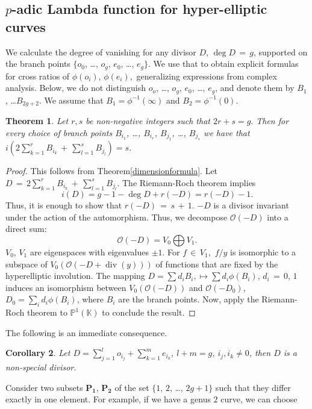 \documentclass[]{amsart}
\numberwithin{equation}{section}
\newtheorem{theorem}{Theorem}[section]
\newtheorem{corollary}[theorem]{Corollary}
\DeclareMathOperator{\divOp}{div}
\begin{document}
\subsection{$p$-adic Lambda function for  hyper-elliptic curves} 
We calculate the degree of vanishing for any divisor $D$, $\deg D \,{=}\,g$, supported on the branch points $\{o_0$, \ldots, $o_g$, $e_0$, \ldots, $e_{g}\}$. We use that to obtain explicit formulas  for cross ratios of  $\phi(o_i)$, $\phi(e_i),$ generalizing expressions
from complex analysis. Below, we do not distinguish $o_o$, \ldots, $o_g$, $e_0$, \ldots, $e_g$, and denote them by $B_1$, \ldots $B_{2g+2}$. We assume that $B_1=\phi^{-1}(\infty)$ and $B_2=\phi^{-1}(0).$
\begin{theorem} \label{mmm}
Let $r,s$ be non-negative integers such that $2r+s=g.$ Then for every choice of branch points $B_{i_1}$, \ldots, $B_{i_r}$, $B_{j_1}$, \ldots, $B_{j_s}$ we have that $i(2\sum_{k=1}^r B_{i_k}\,{+}\,\sum_{l=1}^s B_{j_l})=s$.
\end{theorem} 
\begin{proof}
This follows  from Theorem\;\ref{dimensionformula}.
Let $D\,{=}\,2\sum_{k=1}^r B_{i_k} \,{+}\,\sum_{l=1}^s B_{j_l}$. The Riemann-Roch theorem implies 
\begin{equation}
i(D)=g-1- \deg D + r({-}D) = r({-}D)-1.
\end{equation}
Thus, it is  enough to show that $r({-}D)\,{=}\,s\,{+}\,1$. ${-}D$ is a divisor invariant under the action of the automorphism. Thus, we decompose  $\mathcal{O}({-}D)$ into a direct sum: $$\mathcal{O}(-D)=V_0\bigoplus V_1.$$  $V_0$, $V_1$ are eigenspaces with eigenvalues $\pm{1}.$  For  $f\,{\in}\, V_1,$ $f/y$ is isomorphic  to a subspace of  
$V_0(\mathcal{O}(-D+\divOp (y)))$ of functions that are fixed by the hyperelliptic involution. The mapping  
$D=\sum d_i B_i,\mapsto \sum d_i\phi(B_i)$,  $d_i\,{=}\,0$, $1$ induces an isomorphism between 
$V_0(\mathcal{O}(-D))$ and $\mathcal{O}(-D_0)$,  $D_0=\sum_{i} d_i\phi(B_i)$, where $B_i$ are the branch points. 
Now, apply the Riemann-Roch theorem to $\mathbb{P}^{1}(\mathbb{K})$ to conclude the result. 
\end{proof}
The following is an immediate consequence.
\begin{corollary} 
Let $D=\sum_{j=1}^{l} o_{i_j}+\sum_{k=1}^{m} e_{i_k}$, $l+m=g$, $i_j, i_k \neq 0$, then $D$ is a non-special divisor. 
\end{corollary}  
Consider two subsets $\mathbf{P_1}$, $\mathbf{P_2}$ of the set $\{1$, $2$, \ldots, $2g+1\}$ such that they  differ exactly in one element. For example, if we have a genus $2$ curve, we can choose
\end{document}
